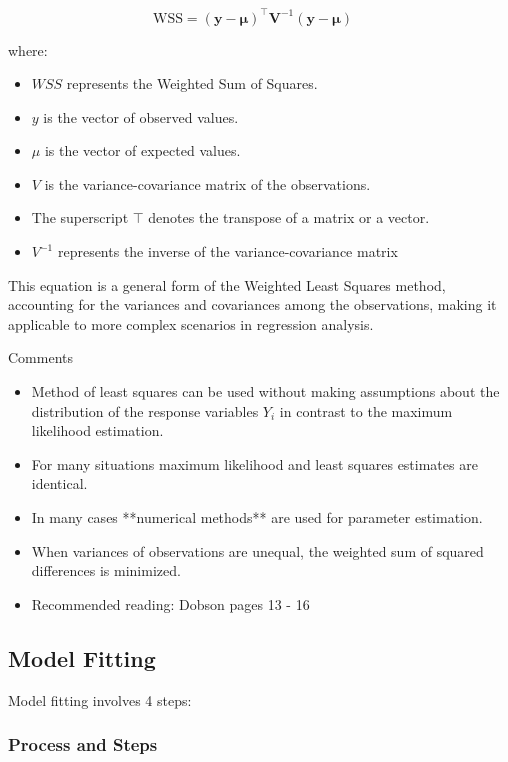 \documentclass[11pt]{article}
\begin{document}
\begin{equation}
    \text{WSS} = (\mathbf{y} - \boldsymbol{\mu})^{\top} \mathbf{V}^{-1} (\mathbf{y} - \boldsymbol{\mu}) \quad
\end{equation}

where:

\begin{itemize}
    \item $WSS$ represents the Weighted Sum of Squares.
    \item $y$ is the vector of observed values.
    \item $\mu$ is the vector of expected values.
    \item $V$ is the variance-covariance matrix of the observations.
    \item The superscript $\top$ denotes the transpose of a matrix or a vector.
    \item $V^{-1}$ represents the inverse of the variance-covariance matrix
\end{itemize}

This equation is a general form of the Weighted Least Squares method, accounting for the variances and covariances among the observations, making it applicable to more complex scenarios in regression analysis.

Comments
\begin{itemize}
    \item Method of least squares can be used without making assumptions about the distribution of the response variables $Y_i$ in contrast to the maximum likelihood estimation.
    \item For many situations maximum likelihood and least squares estimates are identical.
    \item In many cases **numerical methods** are used for parameter estimation.
    \item When variances of observations are unequal, the weighted sum of squared differences is minimized.
    \item Recommended reading: Dobson pages 13 - 16
\end{itemize}

\subsection{Model Fitting}
Model fitting involves 4 steps:
\subsubsection{Process and Steps}
\end{document}
